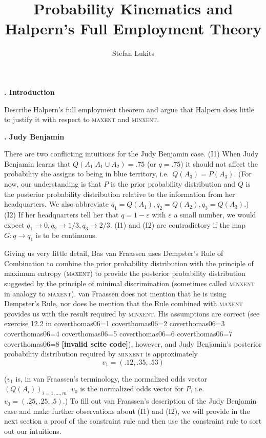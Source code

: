 \documentclass[11pt]{article}
\newcommand{\kapt}[1]{\textbf{{\thechap}. #1}\addtocounter{chap}{1}}
\newif\ifNumericalOrYear
\newcommand{\PageP}{p.~}
\newcommand{\PageP}{}
\newcommand{\scite}[3]{\ifnum#1=1\ifNumericalOrYear\citep{#2}\else\citeyearpar{#2}\fi\else
\ifnum#1=2\ifNumericalOrYear\citep[#3]{#2}\else\citep[{\PageP}#3]{#2}\fi\else
\ifnum#1=3\ifNumericalOrYear(\citet[#3]{#2})\else\citep[{\PageP}#3]{#2}\fi\else
\ifnum#1=4\ifNumericalOrYear\citet{#2}\else\citet{#2}\fi\else
\ifnum#1=5\ifNumericalOrYear(\citet{#2})\else\citep{#2}\fi\else
\ifnum#1=6\ifNumericalOrYear(\citet[#3]{#2})\else\citep[{\PageP}#3]{#2}\fi\else
\ifnum#1=7\ifNumericalOrYear\citep{#2}\else\citealp{#2}\fi\else
\ifnum#1=8\ifNumericalOrYear\citep[#3]{#2}\else\citealp[{\PageP}#3]{#2}\fi\else
\textbf{[invalid scite code]}\fi\fi\fi\fi\fi\fi\fi\fi}
\begin{document}
\title{Probability Kinematics and Halpern's Full Employment Theory}

\author{Stefan Lukits}

\maketitle


\setcounter{chap}{1}

\kapt{Introduction}

Describe Halpern's full employment theorem and argue that Halpern does
little to justify it with respect to \textsc{maxent} and \textsc{minxent}.

\kapt{Judy Benjamin}

There are two conflicting intuitions for the Judy Benjamin case. (I1)
When Judy Benjamin learns that $Q(A_{1}|A_{1}\cup{}A_{2})=.75$ (or
$q=.75$) it should not affect the probability she assigns to being in
blue territory, i.e.\ $Q(A_{3})=P(A_{3})$. (For now, our understanding
is that $P$ is the prior probability distribution and $Q$ is the
posterior probability distribution relative to the information from
her headquarters. We also abbreviate
$q_{1}=Q(A_{1}),q_{2}=Q(A_{2}),q_{3}=Q(A_{3})$.) (I2) If her
headquarters tell her that $q=1-\varepsilon$ with $\varepsilon$ a
small number, we would expect
$q_{1}\rightarrow{}0,q_{2}\rightarrow{}1/3,q_{3}\rightarrow{}2/3$. (I1)
and (I2) are contradictory if the map $G:q\rightarrow{}q_{1}$ is to be
continuous.

Giving us very little detail, Bas van Fraassen uses Dempster's Rule of
Combination to combine the prior probability distribution with the
principle of maximum entropy (\textsc{maxent}) to provide the
posterior probability distribution suggested by the principle of
minimal discrimination (sometimes called \textsc{minxent} in analogy
to \textsc{maxent}). van Fraassen does not mention that he is using
Dempster's Rule, nor does he mention that the Rule combined with
\textsc{maxent} provides us with the result required by
\textsc{minxent}. His assumptions are correct (see exercise 12.2 in
\scite{coverthomas06}{7}{}), however, and Judy Benjamin's posterior
probability distribution required by \textsc{minxent} is approximately
\begin{equation}
  \label{eq:minxent}
  v_{1}=(.12,.35,.53)
\end{equation}

($v_{1}$ is, in van Fraassen's terminology, the normalized odds vector
$(Q(A_{i}))_{i=1,\ldots,m}$. $v_{0}$ is the normalized odds vector for
$P$, i.e.\ $v_{0}=(.25,.25,.5)$.) To fill out van Fraassen's
description of the Judy Benjamin case and make further observations
about (I1) and (I2), we will provide in the next section a proof of
the constraint rule and then use the constraint rule to sort out our
intuitions.
\end{document}
